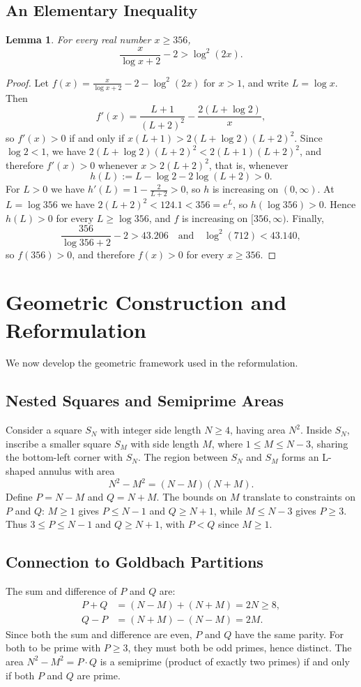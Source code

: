 \documentclass[11pt]{amsart}
\newtheorem{Lemma}[Theorem]{Lemma}
\theoremstyle{definition}
\theoremstyle{remark}
\begin{document}
\subsection{An Elementary Inequality}
\begin{Lemma}\label{lem:elementary}
For every real number $x\geq 356$,
\[
\frac{x}{\log x+2}-2>\log^2(2x).
\]
\end{Lemma}
\begin{proof}
Let $f(x)=\frac{x}{\log x+2}-2-\log^2(2x)$ for $x>1$, and write $L=\log x$. Then
\[
f'(x)=\frac{L+1}{(L+2)^2}-\frac{2(L+\log 2)}{x},
\]
so $f'(x)>0$ if and only if $x(L+1)>2(L+\log 2)(L+2)^2$. Since $\log 2<1$, we have $2(L+\log 2)(L+2)^2<2(L+1)(L+2)^2$, and therefore $f'(x)>0$ whenever $x>2(L+2)^2$, that is, whenever
\[
h(L):=L-\log 2-2\log(L+2)>0.
\]
For $L>0$ we have $h'(L)=1-\frac{2}{L+2}>0$, so $h$ is increasing on $(0,\infty)$. At $L=\log 356$ we have $2(L+2)^2<124.1<356=e^{L}$, so $h(\log 356)>0$. Hence $h(L)>0$ for every $L\geq \log 356$, and $f$ is increasing on $[356,\infty)$. Finally,
\[
\frac{356}{\log 356+2}-2>43.206 \quad\text{and}\quad \log^2(712)<43.140,
\]
so $f(356)>0$, and therefore $f(x)>0$ for every $x\geq 356$.
\end{proof}
\section{Geometric Construction and Reformulation}\label{sec:geometric}
We now develop the geometric framework used in the reformulation.
\subsection{Nested Squares and Semiprime Areas}
Consider a square $S_N$ with integer side length $N \geq 4$, having area $N^2$. Inside $S_N$, inscribe a smaller square $S_M$ with side length $M$, where $1 \leq M \leq N-3$, sharing the bottom-left corner with $S_N$. The region between $S_N$ and $S_M$ forms an L-shaped annulus with area
\[
N^2 - M^2 = (N - M)(N + M).
\]
Define $P = N - M$ and $Q = N + M$. The bounds on $M$ translate to constraints on $P$ and $Q$: $M \geq 1$ gives $P \leq N - 1$ and $Q \geq N + 1$, while $M \leq N - 3$ gives $P \geq 3$. Thus $3 \leq P \leq N-1$ and $Q \geq N+1$, with $P < Q$ since $M \geq 1$.
\subsection{Connection to Goldbach Partitions}
The sum and difference of $P$ and $Q$ are:
\begin{align*}
P + Q &= (N - M) + (N + M) = 2N \geq 8, \\
Q - P &= (N + M) - (N - M) = 2M.
\end{align*}
Since both the sum and difference are even, $P$ and $Q$ have the same parity. For both to be prime with $P \geq 3$, they must both be odd primes, hence distinct. The area $N^2 - M^2 = P \cdot Q$ is a semiprime (product of exactly two primes) if and only if both $P$ and $Q$ are prime.
\end{document}

